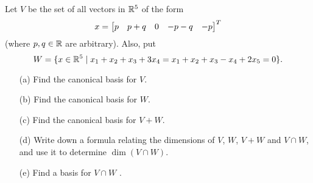 \documentclass[a4paper]{article}
\begin{document}
\begin{problem}[Mock 1]
 Let $V$ be the set of all vectors in ${\mathbb{R}}^5$ of the form 
 \[ x = \left[\begin{matrix} p & p+q & 0 & -p-q & -p \end{matrix}\right]^T \]
 (where $p,q\in{\mathbb{R}}$ are arbitrary).  Also, put 
 \[ W = \{x\in{\mathbb{R}}^5\;|\; x_1+x_2+x_3+3x_4=x_1+x_2+x_3-x_4+2x_5=0\}. \]
 \begin{itemize}
  \item[(a)] Find the canonical basis for $V$. 
  \item[(b)] Find the canonical basis for $W$. 
  \item[(c)] Find the canonical basis for $V+W$. 
  \item[(d)] Write down a formula relating the dimensions of
   $V$, $W$, $V+W$ and $V\cap W$, and use it to determine
   $\dim(V\cap W)$. 
  \item[(e)] Find a basis for $V\cap W$ .
 \end{itemize}
\end{problem}
\end{document}
